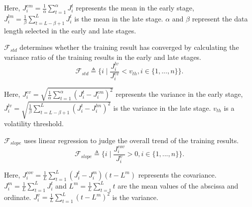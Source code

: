 \documentclass[lettersize,journal]{IEEEtran}
\begin{document}
Here, $J_i^{em}= \frac{1}{\alpha}\sum_{t=1}^\alpha J_i^t$ represents the mean in the early stage, $ J_i^{lm} = \frac{1}{\beta}\sum_{t=L-\beta+1}^L J_i^{t}$ is the mean in the late stage. $\alpha$ and $\beta$ represent the data length selected in the early and late stages.

$\mathcal{F}_{std}$ determines whether the training result has converged by calculating the variance ratio of the training results in the early and late stages.
\begin{equation}
\label{eqstd}
    \mathcal{F}_{std} \triangleq \{i \mid \frac{J_i^{lv}}{J_i^{ev}} < v_{th}, i\in \{1,...,n\}\}.
\end{equation}

Here, $J_i^{ev}= \sqrt{\frac{1}{\alpha}\sum_{t=1}^\alpha (J_i^t - J_i^{em})^2}$ represents the variance in the early stage, $ J_i^{lv} = \sqrt{\frac{1}{\beta}\sum_{t=L-\beta+1}^L (J_i^{t}-J_i^{lm})^2}$ is the variance in the late stage. $v_{th}$ is a volatility threshold.

$\mathcal{F}_{slope}$ uses linear regression to judge the overall trend of the training results.
\begin{equation}
\label{eqslope}
    \mathcal{F}_{slope} \triangleq \{i \mid \frac{J_i^{cov}}{J_i^{v}} > 0, i\in \{1,...,n\}\}.
\end{equation}

Here, $J_i^{cov} = \frac{1}{L}\sum_{t=1}^L (J_i^t - J_i^{m})(t-L^m)$ represents the covariance. 
$J_i^{m} = \frac{1}{L}\sum_{t=1}^L J_i^t$ and $L^m = \frac{1}{L}\sum_{t=1}^L t$ are the mean values of the abscissa and ordinate.
$J_i^{v} = \frac{1}{L}\sum_{t=1}^L (t-L^{m})^2$ is the variance.
\end{document}
